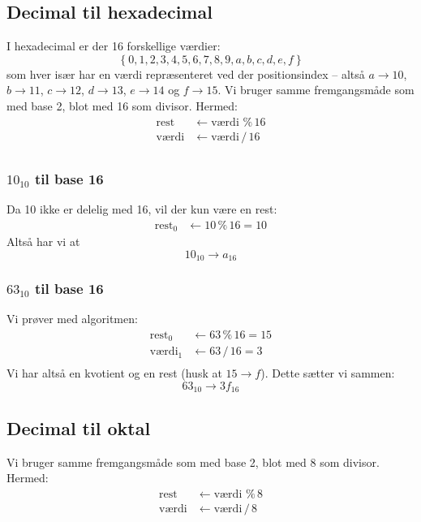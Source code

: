 \documentclass{article}
\begin{document}
\subsection*{Decimal til hexadecimal}
I hexadecimal er der 16 forskellige værdier:$$\left\{0,1,2,3,4,5,6,7,8,9,a,b,c,d,e,f\right\}$$som hver især har en værdi repræsenteret ved der positionsindex -- altså $a\rightarrow10$, $b\rightarrow11$, $c\rightarrow12$, $d\rightarrow13$, $e\rightarrow14$ og $f\rightarrow15$. Vi bruger samme fremgangsmåde som med base 2, blot med 16 som divisor. Hermed:
\begin{align*}
    \text{rest} & \leftarrow \text{værdi } \%\, 16\\
    \text{værdi} & \leftarrow \text{værdi}\, /\, 16\\
\end{align*}
\subsubsection*{$10_{10}$ til base 16}
Da 10 ikke er delelig med 16, vil der kun være en rest:
\begin{align*}
    \text{rest}_0 & \leftarrow 10 \,\%\, 16=10
\end{align*}
Altså har vi at \begin{equation}
    10_{10}\rightarrow a_{16}
\end{equation}
\subsubsection*{$63_{10}$ til base 16}
Vi prøver med algoritmen:
\begin{align*}
    \text{rest}_0 & \leftarrow 63\, \%\, 16=15\\
    \text{værdi}_1 & \leftarrow 63\, /\, 16=3\\
\end{align*}
Vi har altså en kvotient og en rest (husk at $15\rightarrow f$). Dette sætter vi sammen:\begin{equation}
    63_{10}\rightarrow 3f_{16}
\end{equation}

\subsection*{Decimal til oktal}
Vi bruger samme fremgangsmåde som med base 2, blot med 8 som divisor. Hermed:
\begin{align*}
    \text{rest} & \leftarrow \text{værdi } \%\, 8\\
    \text{værdi} & \leftarrow \text{værdi}\, /\, 8\\
\end{align*}
\end{document}
